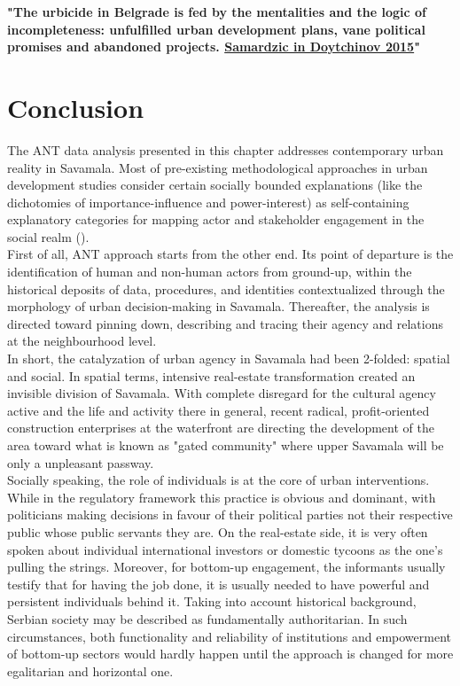 \documentclass[11pt]{report}
\begin{document}
\textbf{"The  urbicide  in  Belgrade  is  fed  by  the  mentalities and  the  logic  of  incompleteness:  unfulfilled  urban development  plans,  vane  political  promises  and abandoned  projects. \href{}{Samardzic in Doytchinov 2015}"}

\section{Conclusion}

The ANT data analysis presented in this chapter addresses contemporary urban reality in Savamala.
Most of pre-existing methodological approaches in urban development studies consider certain socially bounded explanations (like the dichotomies of importance-influence and power-interest) as self-containing explanatory categories for mapping actor and stakeholder engagement in the social realm (\cite{Mathur et al. 2007}).
\\

First of all, ANT approach starts from the other end.
Its point of departure is the identification of human and non-human actors from ground-up, within the historical deposits of data, procedures, and identities contextualized through the morphology of urban decision-making in Savamala.
Thereafter, the analysis is directed toward pinning down, describing and tracing  their agency and relations at the neighbourhood level.
\\

In short, the catalyzation of urban agency in Savamala had been 2-folded: spatial and social.
In spatial terms, intensive real-estate transformation created an invisible division of Savamala. With complete disregard for the cultural agency active and the life and activity there in general, recent radical, profit-oriented construction enterprises at the waterfront are directing the development of the area toward what is known as "gated community" where upper Savamala will be only a unpleasant passway.
\\

Socially speaking, the role of individuals is at the core of urban interventions.
While in the regulatory framework this practice is obvious and dominant, with politicians making decisions in favour of their political parties not their respective public whose public servants they are.
On the real-estate side, it is very often spoken about individual international investors or domestic tycoons as the one's pulling the strings.
Moreover, for bottom-up engagement, the informants usually testify that for having the job done, it is usually needed to have powerful and persistent individuals behind it.
Taking into account historical background, Serbian society may be described as fundamentally authoritarian.
In such circumstances, both functionality and reliability of institutions and empowerment of bottom-up sectors would hardly happen until the approach is changed for more egalitarian and horizontal one. 
\\
\end{document}
